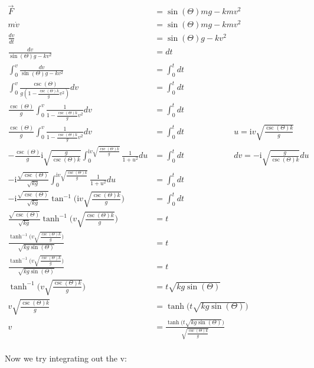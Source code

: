 \documentclass[10pt]{article} %
\begin{document}
\begin{align*}
  \vec{F} &= \sin(\Theta)mg - kmv^2\\
  m\dot{v} &= \sin(\Theta)mg - kmv^2\\
  \frac{dv}{dt} &= \sin(\Theta)g - kv^2\\
  \frac{dv}{\sin(\Theta)g - kv^2} &= dt\\
  \int_0^{v} \frac{dv}{\sin(\Theta)g - kv^2} &= \int_0^t dt\\
  \int_0^{v} \frac{\csc(\Theta)}{g(1 - \frac{\csc(\Theta)k}{g}v^2)}dv &= \int_0^t dt\\
  \frac{\csc(\Theta)}{g}\int_0^{v} \frac{1}{1 - \frac{\csc(\Theta)k}{g}v^2}dv &= \int_0^t dt\\
  \frac{\csc(\Theta)}{g}\int_0^{v} \frac{1}{1 - \frac{\csc(\Theta)k}{g}v^2}dv &= \int_0^t dt
  \hspace{1in} u = \mathrm{i}v\sqrt{\frac{\csc(\Theta)k}{g}}\\
  -\frac{\csc(\Theta)}{g}\mathrm{i}\sqrt{\frac{g}{\csc(\Theta)k}}\int_0^{\mathrm{i}v\sqrt{\frac{\csc(\Theta)k}{g}}} \frac{1}{1 + u^2}du &= \int_0^t dt
  \hspace{1in} dv = -\mathrm{i}\sqrt{\frac{g}{\csc(\Theta)k}}du\\
  -\mathrm{i}\frac{\sqrt{\csc(\Theta)}}{\sqrt{kg}} \int_0^{\mathrm{i}v\sqrt{\frac{\csc(\Theta)k}{g}}} \frac{1}{1 + u^2}du &= \int_0^t dt\\
  -\mathrm{i}\frac{\sqrt{\csc(\Theta)}}{\sqrt{kg}} \tan^{-1}\Bigg(\mathrm{i}v\sqrt{\frac{\csc(\Theta)k}{g}}\Bigg) &= \int_0^t dt\\
  \frac{\sqrt{\csc(\Theta)}}{\sqrt{kg}} \tanh^{-1}\Bigg(v\sqrt{\frac{\csc(\Theta)k}{g}}\Bigg) &= t\\
  \frac{\tanh^{-1}\Bigg(v\sqrt{\frac{\csc(\Theta)k}{g}}\Bigg)}{\sqrt{kg\sin(\Theta)}} &= t\\ 
  \frac{\tanh^{-1}\Bigg(v\sqrt{\frac{\csc(\Theta)k}{g}}\Bigg)}{\sqrt{kg\sin(\Theta)}} &= t\\
  \tanh^{-1}\Bigg(v\sqrt{\frac{\csc(\Theta)k}{g}}\Bigg) &= t\sqrt{kg\sin(\Theta)}\\
  v\sqrt{\frac{\csc(\Theta)k}{g}} &= \tanh\Big(t\sqrt{kg\sin(\Theta)}\Big)\\
  v &= \frac{\tanh\Big(t\sqrt{kg\sin(\Theta)}\Big)}{\sqrt{\frac{\csc(\Theta)k}{g}}}\\    
\end{align*}

Now we try integrating out the v:
\end{document}
